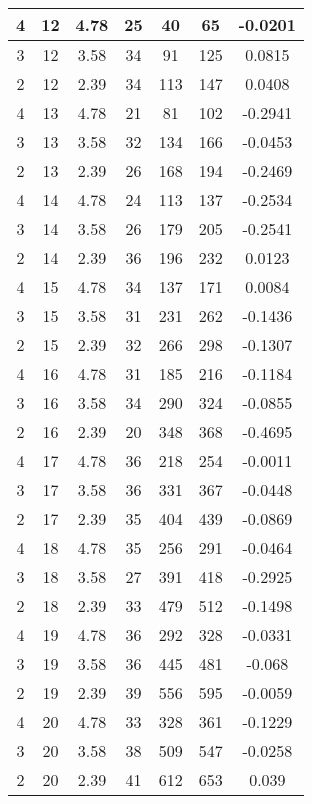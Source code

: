 \documentclass[letterpaper, 12pt]{article}
\begin{document}
\begin{longtable}{|c|c|c|c|c|c|c|}
\hline
4 & 12 & 4.78 & 25 & 40 & 65 & -0.0201 \\
\hline
3 & 12 & 3.58 & 34 & 91 & 125 & 0.0815 \\
\hline
2 & 12 & 2.39 & 34 & 113 & 147 & 0.0408 \\
\hline
4 & 13 & 4.78 & 21 & 81 & 102 & -0.2941 \\
\hline
3 & 13 & 3.58 & 32 & 134 & 166 & -0.0453 \\
\hline
2 & 13 & 2.39 & 26 & 168 & 194 & -0.2469 \\
\hline
4 & 14 & 4.78 & 24 & 113 & 137 & -0.2534 \\
\hline
3 & 14 & 3.58 & 26 & 179 & 205 & -0.2541 \\
\hline
2 & 14 & 2.39 & 36 & 196 & 232 & 0.0123 \\
\hline
4 & 15 & 4.78 & 34 & 137 & 171 & 0.0084 \\
\hline
3 & 15 & 3.58 & 31 & 231 & 262 & -0.1436 \\
\hline
2 & 15 & 2.39 & 32 & 266 & 298 & -0.1307 \\
\hline
4 & 16 & 4.78 & 31 & 185 & 216 & -0.1184 \\
\hline
3 & 16 & 3.58 & 34 & 290 & 324 & -0.0855 \\
\hline
2 & 16 & 2.39 & 20 & 348 & 368 & -0.4695 \\
\hline
4 & 17 & 4.78 & 36 & 218 & 254 & -0.0011 \\
\hline
3 & 17 & 3.58 & 36 & 331 & 367 & -0.0448 \\
\hline
2 & 17 & 2.39 & 35 & 404 & 439 & -0.0869 \\
\hline
4 & 18 & 4.78 & 35 & 256 & 291 & -0.0464 \\
\hline
3 & 18 & 3.58 & 27 & 391 & 418 & -0.2925 \\
\hline
2 & 18 & 2.39 & 33 & 479 & 512 & -0.1498 \\
\hline
4 & 19 & 4.78 & 36 & 292 & 328 & -0.0331 \\
\hline
3 & 19 & 3.58 & 36 & 445 & 481 & -0.068 \\
\hline
2 & 19 & 2.39 & 39 & 556 & 595 & -0.0059 \\
\hline
4 & 20 & 4.78 & 33 & 328 & 361 & -0.1229 \\
\hline
3 & 20 & 3.58 & 38 & 509 & 547 & -0.0258 \\
\hline
2 & 20 & 2.39 & 41 & 612 & 653 & 0.039 \\
\hline
\end{longtable}
\end{document}
